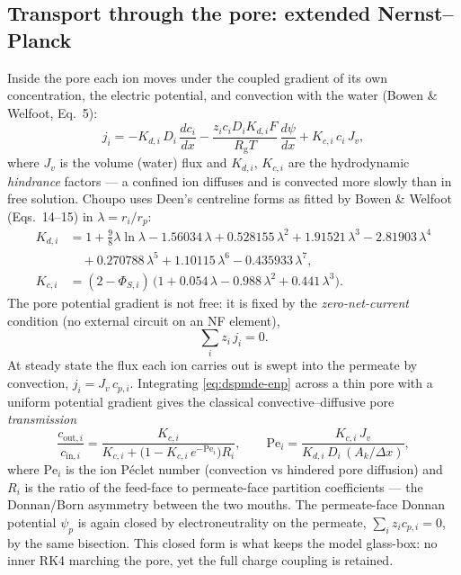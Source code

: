 \documentclass[11pt,a4paper]{article}
\newcommand{\Rgas}{R_{\!\mathrm{g}}}                %
\begin{document}
\subsection{Transport through the pore: extended Nernst--Planck}

Inside the pore each ion moves under the coupled gradient of its own
concentration, the electric potential, and convection with the water
(Bowen \& Welfoot, Eq.~5):
\begin{equation}
   j_i = -K_{d,i}\,D_i\,\frac{dc_i}{dx}
         - \frac{z_i c_i D_i K_{d,i} F}{\Rgas T}\,\frac{d\psi}{dx}
         + K_{c,i}\,c_i\,J_v,
   \label{eq:dspmde-enp}
\end{equation}
where $J_v$ is the volume (water) flux and $K_{d,i}$, $K_{c,i}$ are the
hydrodynamic \emph{hindrance} factors --- a confined ion diffuses and is
convected more slowly than in free solution.  Choupo uses Deen's
centreline forms \cite{Deen1987} as fitted by Bowen \& Welfoot
(Eqs.~14--15) in $\lambda=r_i/r_p$:
\begin{align}
   K_{d,i} &= 1 + \tfrac{9}{8}\lambda\ln\lambda - 1.56034\,\lambda
              + 0.528155\,\lambda^2 + 1.91521\,\lambda^3 - 2.81903\,\lambda^4
              \nonumber\\
           &\quad {}+ 0.270788\,\lambda^5 + 1.10115\,\lambda^6
              - 0.435933\,\lambda^7, \label{eq:dspmde-Kd}\\
   K_{c,i} &= (2-\Phi_{S,i})\,
              \bigl(1 + 0.054\,\lambda - 0.988\,\lambda^2 + 0.441\,\lambda^3\bigr).
   \label{eq:dspmde-Kc}
\end{align}
The pore potential gradient is not free: it is fixed by the
\emph{zero-net-current} condition (no external circuit on an NF
element),
\begin{equation}
   \sum_i z_i\, j_i = 0.
   \label{eq:dspmde-current}
\end{equation}
At steady state the flux each ion carries out is swept into the permeate
by convection, $j_i = J_v\,c_{p,i}$.  Integrating \eqref{eq:dspmde-enp}
across a thin pore with a uniform potential gradient gives the
classical convective--diffusive pore \emph{transmission}
\begin{equation}
   \frac{c_{\text{out},i}}{c_{\text{in},i}}
   = \frac{K_{c,i}}{K_{c,i} + \bigl(1 - K_{c,i}\,e^{-\mathrm{Pe}_i}\bigr)R_i},
   \qquad
   \mathrm{Pe}_i = \frac{K_{c,i}\,J_v}{K_{d,i}\,D_i\,(A_k/\Delta x)},
   \label{eq:dspmde-transmission}
\end{equation}
where $\mathrm{Pe}_i$ is the ion P\'eclet number (convection vs hindered
pore diffusion) and $R_i$ is the ratio of the feed-face to permeate-face
partition coefficients --- the Donnan/Born asymmetry between the two
mouths.  The permeate-face Donnan potential $\psi_p$ is again closed by
electroneutrality on the permeate, $\sum_i z_i c_{p,i}=0$, by the same
bisection.  This closed form is what keeps the model glass-box: no inner
RK4 marching the pore, yet the full charge coupling is retained.
\end{document}
